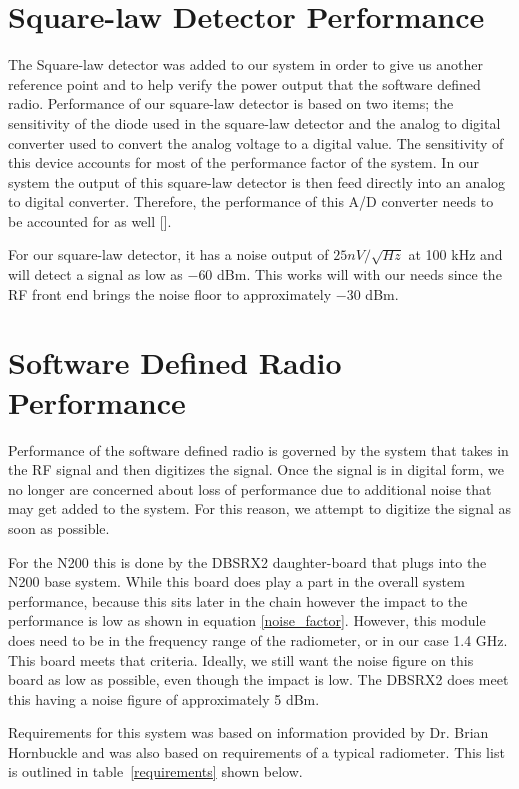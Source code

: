 \section{Square-law Detector Performance}
The Square-law detector was added to our system in order to give us another reference point and to help verify the power output that the software defined radio.  Performance of our square-law detector is based on two items; the sensitivity of the diode used in the square-law detector and the analog to digital converter used to convert the analog voltage to a digital value.  The sensitivity of this device accounts for most of the performance factor of the system.  In our system the output of this square-law detector is then feed directly into an analog to digital converter.  Therefore, the performance of this A/D converter needs to be accounted for as well [\cite{Terlep}].  

For our square-law detector, it has a noise output of $25nV/ \sqrt{Hz}$ at 100 kHz and will detect a signal as low as $-60$ dBm.  This works will with our needs since the RF front end brings the noise floor to approximately $-30$ dBm.


\section{Software Defined Radio Performance}
Performance of the software defined radio is governed by the system that takes in the RF signal and then digitizes the signal.  Once the signal is in digital form, we no longer are concerned about loss of performance due to additional noise that may get added to the system.  For this reason, we attempt to digitize the signal as soon as possible.

For the N200 this is done by the DBSRX2 daughter-board that plugs into the N200 base system.  While this board does play a part in the overall system performance, because this sits later in the chain however the impact to the performance is low as shown in equation \ref{noise_factor}.  However, this module does need to be in the frequency range of the radiometer, or in our case 1.4 GHz.  This board meets that criteria.  Ideally, we still want the noise figure on this board as low as possible, even though the impact is low.  The DBSRX2 does meet this having a noise figure of approximately 5 dBm.


Requirements for this system was based on information provided by Dr. Brian Hornbuckle and was also based on requirements of a typical radiometer.  This list is outlined in table~\ref{requirements} shown below.

